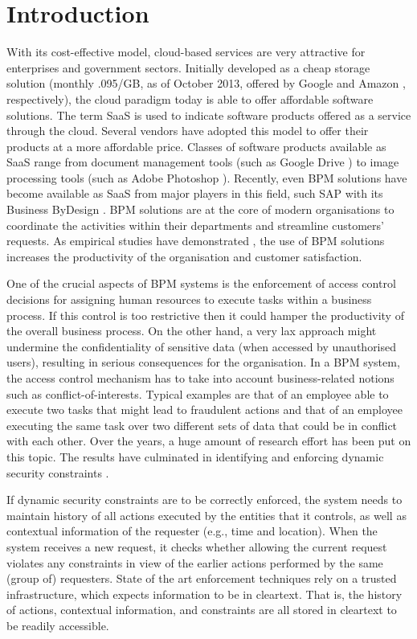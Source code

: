 \documentclass[epsfig,a4paper,11pt,titlepage]{book}
\numberwithin{algorithm}{chapter}
\begin{document}
\section{Introduction}
With its cost-effective model, cloud-based services are very attractive for enterprises and government sectors. Initially developed as a cheap storage solution (monthly \0.095/GB, as of October 2013, offered by Google \cite{Google:2013} and Amazon \cite{Amazon:2013}, respectively), the cloud paradigm today is able to offer affordable software solutions. The term \acrfull{SaaS} is used to indicate software products offered as a service through the cloud. Several vendors have adopted this model to offer their products at a more affordable price. Classes of software products available as \gls{SaaS} range from document management tools (such as Google Drive \cite{Google:2012}) to image processing tools (such as Adobe Photoshop \cite{Pehrson:2011}). Recently, even \gls{BPM} solutions have become available as \gls{SaaS} from major players in this field, such SAP with its Business ByDesign \cite{SAP:2013}. \gls{BPM} solutions are at the core of modern organisations to coordinate the activities within their departments and streamline customers' requests. As empirical studies have demonstrated \cite{Kohlbacher:2009}, the use of \gls{BPM} solutions increases the productivity of the organisation and customer satisfaction.

One of the crucial aspects of \gls{BPM} systems is the enforcement of access control decisions for assigning human resources to execute tasks within a business process. If this control is too restrictive then it could hamper the productivity of the overall business process. On the other hand, a very lax approach might undermine the confidentiality of sensitive data (when accessed by unauthorised users), resulting in serious consequences for the organisation. In a \gls{BPM} system, the access control mechanism has to take into account business-related notions such as conflict-of-interests. Typical examples are that of an employee able to execute two tasks that might lead to fraudulent actions and that of an employee executing the same task over two different sets of data that could be in conflict with each other. Over the years, a huge amount of research effort has been put on this topic. The results have culminated in identifying and enforcing dynamic security constraints \cite{Kong:2007, Sandhu:1996, Nash:1990, Brewer:1989}.

If dynamic security constraints are to be correctly enforced, the system needs to maintain history of all actions executed by the entities that it controls, as well as contextual information of the requester (e.g., time and location). When the system receives a new request, it checks whether allowing the current request violates any constraints in view of the earlier actions performed by the same (group of) requesters. State of the art enforcement techniques \cite{Crampton:2009, Joshi:2005, Ahn:2000, Gligor:1998} rely on a trusted infrastructure, which expects information to be in cleartext. That is, the history of actions, contextual information, and constraints are all stored in cleartext to be readily accessible. 
\end{document}
